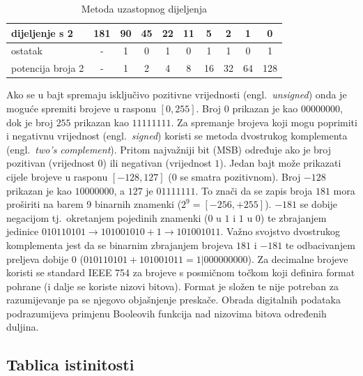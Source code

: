 \documentclass[times, utf8, diplomski]{fer}
\begin{document}
\begin{table}[htb]
	\centering
	\caption{Metoda uzastopnog dijeljenja}
	\label{tab:pretvorba}
	\begin{tabular}{|l|c|c|c|c|c|c|c|c|c|}
		\hline
		dijeljenje s 2 		& 181 	& 90 & 45 & 22 & 11 & 5  & 2  & 1  & 0 \\
		\hline
		ostatak 			& -		& 1  & 0  & 1  & 0  & 1  & 1  & 0  & 1 \\
		\hline
		potencija broja 2 	& -		& 1  & 2  & 4  & 8  & 16 & 32 & 64 & 128 \\
		\hline
	\end{tabular}
\end{table}

Ako se u bajt spremaju isključivo pozitivne vrijednosti (engl.~\textit{unsigned}) onda je moguće spremiti brojeve u rasponu $[0, 255]$. Broj $0$ prikazan je kao $00000000$, dok je broj $255$ prikazan kao $11111111$. Za spremanje brojeva koji mogu poprimiti i negativnu vrijednost (engl.~\textit{signed}) koristi se metoda dvostrukog komplementa (engl.~\textit{two's complement}). Pritom najvažniji bit (MSB) određuje ako je broj pozitivan (vrijednost $0$) ili negativan (vrijednost $1$). Jedan bajt može prikazati cijele brojeve u rasponu $[-128, 127]$ ($0$ se smatra pozitivnom). Broj $-128$ prikazan je kao $10000000$, a $127$ je $01111111$. To znači da se zapis broja $181$ mora proširiti na barem 9 binarnih znamenki ($2^{9}=[-256, +255]$). $-181$ se dobije negacijom tj.~okretanjem pojedinih znamenki ($0$ u $1$ i $1$ u $0$) te zbrajanjem jedinice $010110101 \to 101001010 + 1 \to 101001011$. Važno svojstvo dvostrukog komplementa jest da se binarnim zbrajanjem brojeva $181$ i $-181$ te odbacivanjem preljeva dobije $0$ ($010110101 + 101001011 = 1|000000000$). Za decimalne brojeve koristi se standard IEEE 754 za brojeve s posmičnom točkom koji definira format pohrane (i dalje se koriste nizovi bitova). Format je složen te nije potreban za razumijevanje pa se njegovo objašnjenje preskače. Obrada digitalnih podataka podrazumijeva primjenu Booleovih funkcija nad nizovima bitova određenih duljina.

\subsection{Tablica istinitosti}
\end{document}
